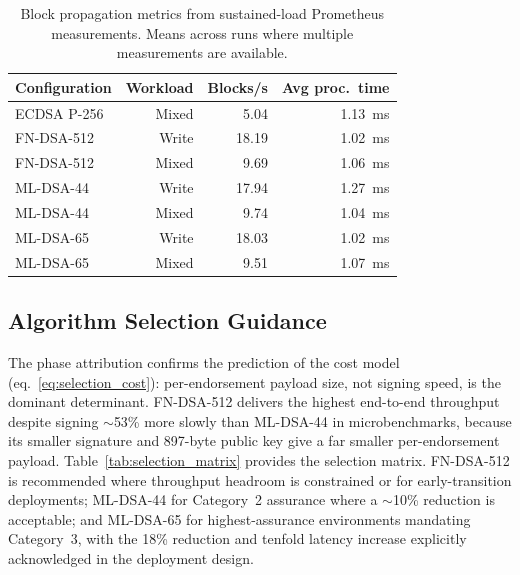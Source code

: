 \documentclass{ieeetj}
\begin{document}
\begin{table}[ht]
\centering
\caption{Block propagation metrics from sustained-load Prometheus measurements.
Means across runs where multiple measurements are available.}
\label{tab:block_prop}
\begin{tabular}{@{}lrrr@{}}
\toprule
\textbf{Configuration} & \textbf{Workload} &
\textbf{Blocks/s} & \textbf{Avg proc.\ time} \\
\midrule
ECDSA P-256 & Mixed  & 5.04 & 1.13~ms \\
\addlinespace
FN-DSA-512  & Write  & 18.19 & 1.02~ms \\
FN-DSA-512  & Mixed  & 9.69  & 1.06~ms \\
ML-DSA-44   & Write  & 17.94 & 1.27~ms \\
ML-DSA-44   & Mixed  & 9.74  & 1.04~ms \\
ML-DSA-65   & Write  & 18.03 & 1.02~ms \\
ML-DSA-65   & Mixed  & 9.51  & 1.07~ms \\
\bottomrule
\end{tabular}
\end{table}

\subsection{Algorithm Selection Guidance}
\label{sec:res_selection}

The phase attribution confirms the prediction of the cost model
(eq.~\ref{eq:selection_cost}): per-endorsement payload size, not signing speed,
is the dominant determinant. FN-DSA-512 delivers the highest end-to-end
throughput despite signing $\sim$53\% more slowly than ML-DSA-44 in
microbenchmarks, because its smaller signature and 897-byte public key give a far
smaller per-endorsement payload. Table~\ref{tab:selection_matrix} provides the
selection matrix. FN-DSA-512 is recommended where throughput headroom is
constrained or for early-transition deployments; ML-DSA-44 for Category~2
assurance where a $\sim$10\% reduction is acceptable; and ML-DSA-65 for
highest-assurance environments mandating Category~3, with the 18\% reduction and
tenfold latency increase explicitly acknowledged in the deployment design.
\end{document}
